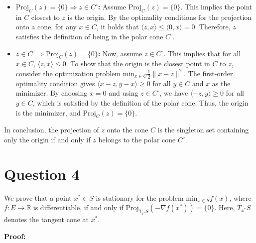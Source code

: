 \documentclass[12p]{article}
\begin{document}
\begin{itemize}
    \item \textbf{\( \text{Proj}_C(z) = \{0\} \Rightarrow z \in C^\circ \):} Assume \( \text{Proj}_C(z) = \{0\} \). This implies the point in \( C \) closest to \( z \) is the origin. By the optimality conditions for the projection onto a cone, for any \( x \in C \), it holds that \( \langle z, x \rangle \leq \langle 0, x \rangle = 0 \). Therefore, \( z \) satisfies the definition of being in the polar cone \( C^\circ \).

    \item \textbf{\( z \in C^\circ \Rightarrow \text{Proj}_C(z) = \{0\} \):} Now, assume \( z \in C^\circ \). This implies that for all \( x \in C \), \( \langle z, x \rangle \leq 0 \). To show that the origin is the closest point in \( C \) to \( z \), consider the optimization problem \( \text{min}_{x \in C} \frac{1}{2} \|x - z\|^2 \). The first-order optimality condition gives \( \langle x - z, y - x \rangle \geq 0 \) for all \( y \in C \) and \( x \) as the minimizer. By choosing \( x = 0 \) and using \( z \in C^\circ \), we have \( \langle -z, y \rangle \geq 0 \) for all \( y \in C \), which is satisfied by the definition of the polar cone. Thus, the origin is the minimizer, and \( \text{Proj}_C(z) = \{0\} \).
\end{itemize}

In conclusion, the projection of \( z \) onto the cone \( C \) is the singleton set containing only the origin if and only if \( z \) belongs to the polar cone \( C^\circ \).

\section*{Question 4} 

We prove that a point \( x^* \in S \) is stationary for the problem \( \text{min}_{x \in S} f(x) \), where \( f : E \rightarrow \mathbb{R} \) is differentiable, if and only if \( \text{Proj}_{T_{x^*}S}(-\nabla f(x^*)) = \{0\} \). Here, \( T_{x^*}S \) denotes the tangent cone at \( x^* \).

\textbf{Proof:}
\end{document}
